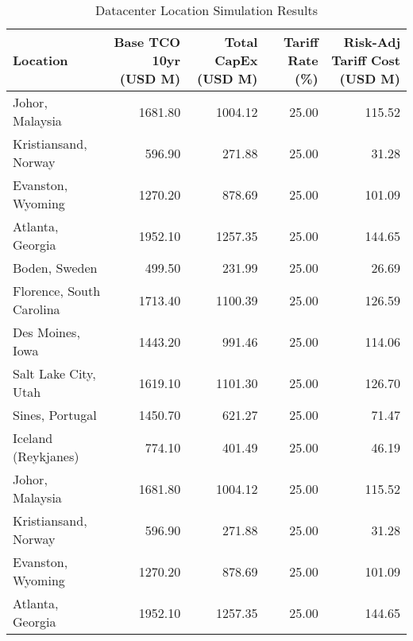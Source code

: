 \begin{table}
\centering
\caption{Datacenter Location Simulation Results}
\label{tab:datacenter_results}
\begin{tabular}{lrrrr}
\toprule
                Location &  Base TCO 10yr (USD M) &  Total CapEx (USD M) &  Tariff Rate (\%) &  Risk-Adj Tariff Cost (USD M) \\
\midrule
         Johor, Malaysia &                1681.80 &              1004.12 &            25.00 &                        115.52 \\
    Kristiansand, Norway &                 596.90 &               271.88 &            25.00 &                         31.28 \\
       Evanston, Wyoming &                1270.20 &               878.69 &            25.00 &                        101.09 \\
        Atlanta, Georgia &                1952.10 &              1257.35 &            25.00 &                        144.65 \\
           Boden, Sweden &                 499.50 &               231.99 &            25.00 &                         26.69 \\
Florence, South Carolina &                1713.40 &              1100.39 &            25.00 &                        126.59 \\
        Des Moines, Iowa &                1443.20 &               991.46 &            25.00 &                        114.06 \\
    Salt Lake City, Utah &                1619.10 &              1101.30 &            25.00 &                        126.70 \\
         Sines, Portugal &                1450.70 &               621.27 &            25.00 &                         71.47 \\
     Iceland (Reykjanes) &                 774.10 &               401.49 &            25.00 &                         46.19 \\
         Johor, Malaysia &                1681.80 &              1004.12 &            25.00 &                        115.52 \\
    Kristiansand, Norway &                 596.90 &               271.88 &            25.00 &                         31.28 \\
       Evanston, Wyoming &                1270.20 &               878.69 &            25.00 &                        101.09 \\
        Atlanta, Georgia &                1952.10 &              1257.35 &            25.00 &                        144.65 \\

\end{tabular}
\end{table}
